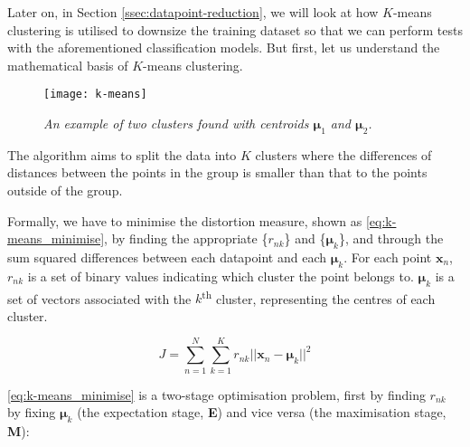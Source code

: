Later on, in Section \ref{ssec:datapoint-reduction}, we will look at how $K$-means clustering is utilised to downsize the training dataset so that we can perform tests with the aforementioned classification models. But first, let us understand the mathematical basis of $K$-means clustering.

\begin{figure}[H]
  \centering
  \texttt{[image: k-means]}
  \caption{\textit{An example of two clusters found with centroids $\mathbf{\mu}_1$ and $\mathbf{\mu}_2$.}}
  \label{fig:k-means}
\end{figure}

The algorithm aims to split the data into $K$ clusters where the differences of distances between the points in the group is smaller than that to the points outside of the group. 

Formally, we have to minimise the distortion measure, shown as \autoref{eq:k-means_minimise}, by finding the appropriate \{$r_{nk}$\} and \{$\mathbf{\mu}_k$\}, and through the sum squared differences between each datapoint and each $\mathbf{\mu}_k$. For each point $\mathbf{x}_n$, $r_{nk}$ is a set of binary values indicating which cluster the point belongs to. $\mathbf{\mu}_k$ is a set of vectors associated with the $k$\textsuperscript{th} cluster, representing the centres of each cluster. 

\begin{equation} \label{eq:k-means_minimise}
  J = \sum_{n=1}^{N} \sum_{k=1}^{K} r_{nk}||\mathbf{x}_n - \mathbf{\mu}_k||^2
\end{equation}

\autoref{eq:k-means_minimise} is a two-stage optimisation problem, first by finding $r_{nk}$ by fixing $\mathbf{\mu}_k$ (the expectation stage, \textbf{E}) and vice versa (the maximisation stage, \textbf{M}):

